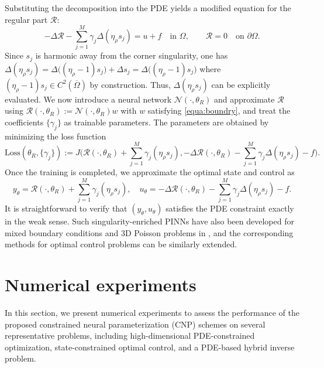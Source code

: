 \documentclass{article}
\numberwithin{equation}{section}
\begin{document}
Substituting the decomposition into the PDE yields a modified equation for the regular part $\mathcal{R}$:
\begin{equation}
-\Delta \mathcal{R} -\sum_{j=1}^M \gamma_j \Delta(\eta_\rho s_j)= u+f
\quad \text{in } \Omega,
\qquad \mathcal{R} = 0 \quad \text{on } \partial \Omega.
\end{equation}
Since $s_j$ is harmonic away from the corner singularity, one has
    $\Delta(\eta_\rho s_j)=\Delta\big((\eta_\rho-1) s_j \big) + \Delta s_j = \Delta\big((\eta_\rho-1) s_j \big)$
where $(\eta_\rho-1) s_j\in C^2(\overline{\Omega
})$ by construction. Thus, $\Delta(\eta_\rho s_j)$ can be explicitly evaluated. We now introduce a neural network $\mathcal{N}(\cdot,\theta_R)$ and approximate $\mathcal{R}$ using $\mathcal{R}(\cdot,\theta_R):=\mathcal{N}(\cdot,\theta_R)w$ with $w$ satisfying \eqref{equa:boundry}, and treat the coefficients $\{\gamma_j\}$ as trainable parameters. The parameters are obtained by minimizing the loss function
\begin{equation}
    \text{Loss}(\theta_R,\{\gamma_j\}):= J\big(\mathcal{R}(\cdot,\theta_R) +\sum_{j=1}^M \gamma_j (\eta_\rho s_j), -\Delta \mathcal{R}(\cdot,\theta_R)-  \sum_{j=1}^M \gamma_j \Delta(\eta_\rho s_j)-f\big).
\end{equation}
Once the training is completed, we approximate the optimal state and control as
\begin{equation}
    y_\theta=\mathcal{R}(\cdot,\theta_R) +\sum_{j=1}^M \gamma_j ( \eta_\rho s_j),\quad u_\theta=-\Delta \mathcal{R}(\cdot,\theta_R)-  \sum_{j=1}^M \gamma_j \Delta(\eta_\rho s_j)-f.
\end{equation}
It is straightforward to verify that $(y_\theta,u_\theta)$ satisfies the PDE constraint exactly in the weak sense. Such singularity-enriched PINNs have also been developed for mixed boundary conditions and 3D Poisson problems in \cite{hu2024solving}, and the corresponding methods for optimal control problems can be similarly extended.

\section{Numerical experiments}
\label{sec:numerical}

In this section, we present numerical experiments to assess the performance of the proposed constrained neural parameterization (CNP) schemes on several representative problems, including high-dimensional PDE-constrained optimization, state-constrained optimal control, and a PDE-based hybrid inverse problem.
\end{document}
